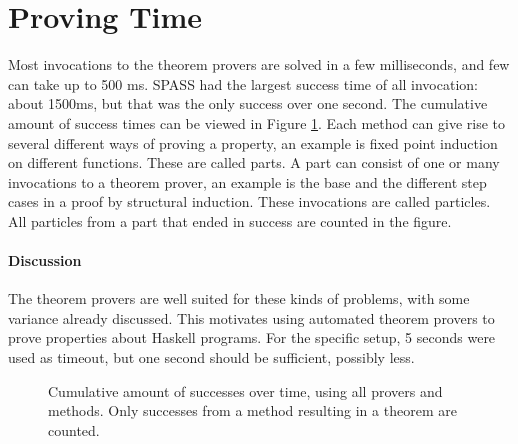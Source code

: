 \section{Proving Time}

Most invocations to the theorem provers are solved in a few
milliseconds, and few can take up to 500 ms. SPASS had the largest
success time of all invocation: about 1500ms, but that was the only success
over one second. The cumulative amount of success times can be viewed
in Figure \ref{fig:provingtime}. Each method can give rise to
several different ways of proving a property, an example is fixed
point induction on different functions. These are called parts. A part
can consist of one or many invocations to a theorem prover, an example
is the base and the different step cases in a proof by structural
induction. These invocations are called particles. All particles from
a part that ended in success are counted in the figure.

\paragraph{Discussion}

The theorem provers are well suited for these kinds of problems, with
some variance already discussed. This motivates using automated
theorem provers to prove properties about Haskell programs. For the
specific setup, 5 seconds were used as timeout, but one second should
be sufficient, possibly less.

\begin{figure}[h]
\centering
{}
\caption{Cumulative amount of successes over time, using all provers
  and methods. Only successes from a method resulting in a theorem are counted.
\label{fig:provingtime}
}
\end{figure}



